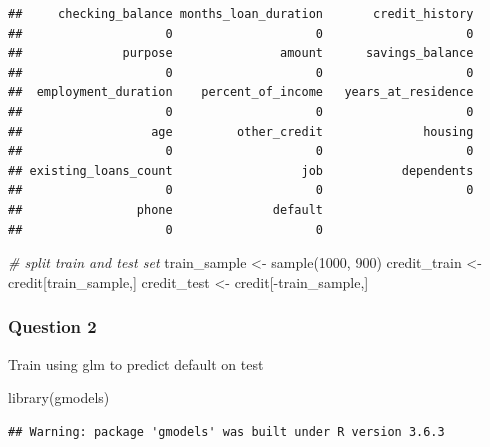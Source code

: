 \documentclass[]{article}
\newenvironment{Shaded}{\begin{snugshade}}{\end{snugshade}}
\newcommand{\CommentTok}[1]{\textcolor[rgb]{0.56,0.35,0.01}{\textit{#1}}}
\newcommand{\DecValTok}[1]{\textcolor[rgb]{0.00,0.00,0.81}{#1}}
\newcommand{\FunctionTok}[1]{\textcolor[rgb]{0.00,0.00,0.00}{#1}}
\newcommand{\NormalTok}[1]{#1}
\newcommand{\OtherTok}[1]{\textcolor[rgb]{0.56,0.35,0.01}{#1}}
\newcommand{\SpecialCharTok}[1]{\textcolor[rgb]{0.00,0.00,0.00}{#1}}
\begin{document}
\begin{verbatim}
##     checking_balance months_loan_duration       credit_history 
##                    0                    0                    0 
##              purpose               amount      savings_balance 
##                    0                    0                    0 
##  employment_duration    percent_of_income   years_at_residence 
##                    0                    0                    0 
##                  age         other_credit              housing 
##                    0                    0                    0 
## existing_loans_count                  job           dependents 
##                    0                    0                    0 
##                phone              default 
##                    0                    0
\end{verbatim}

\begin{Shaded}
\begin{Highlighting}[]
\CommentTok{\# split train and test set}
\NormalTok{train\_sample }\OtherTok{\textless{}{-}} \FunctionTok{sample}\NormalTok{(}\DecValTok{1000}\NormalTok{, }\DecValTok{900}\NormalTok{)}
\NormalTok{credit\_train }\OtherTok{\textless{}{-}}\NormalTok{ credit[train\_sample,]}
\NormalTok{credit\_test }\OtherTok{\textless{}{-}}\NormalTok{ credit[}\SpecialCharTok{{-}}\NormalTok{train\_sample,]}
\end{Highlighting}
\end{Shaded}

\hypertarget{question-2-1}{%
\subsubsection{Question 2}\label{question-2-1}}

Train using glm to predict default on test

\begin{Shaded}
\begin{Highlighting}[]
\FunctionTok{library}\NormalTok{(gmodels)}
\end{Highlighting}
\end{Shaded}

\begin{verbatim}
## Warning: package 'gmodels' was built under R version 3.6.3
\end{verbatim}
\end{document}

